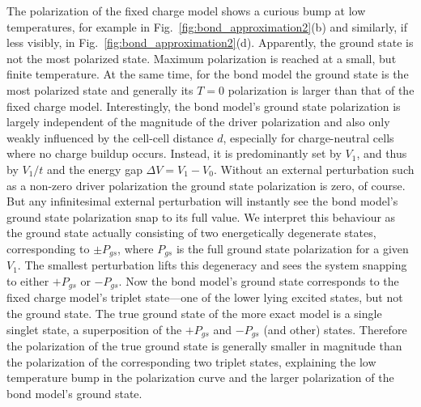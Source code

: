 The polarization of the fixed charge model shows a curious bump at low
temperatures, for example in Fig.~\ref{fig:bond_approximation2}(b) and
similarly, if less visibly, in Fig.~\ref{fig:bond_approximation2}(d).
Apparently, the ground state is not the most polarized state. Maximum
polarization is reached at a small, but finite temperature. At the same time,
for the bond model the ground state is the most polarized state and generally
its $T=0$ polarization is larger than that of the fixed charge model.
Interestingly, the bond model's ground state polarization is largely independent
of the magnitude of the driver polarization and also only weakly influenced by
the cell-cell distance $d$, especially for charge-neutral cells where no charge
buildup occurs. Instead, it is predominantly set by $V_1$, and thus by $V_1/t$
and the energy gap $\Delta V = V_1 - V_0$. Without an external perturbation such
as a non-zero driver polarization the ground state polarization is zero, of
course. But any infinitesimal external perturbation will instantly see the bond
model's ground state polarization snap to its full value. We interpret this
behaviour as the ground state actually consisting of two energetically
degenerate states, corresponding to $\pm P_{gs}$, where $P_{gs}$ is the full
ground state polarization for a given $V_1$. The smallest perturbation lifts
this degeneracy and sees the system snapping to either $+P_{gs}$ or $-P_{gs}$.
Now the bond model's ground state corresponds to the fixed charge model's
triplet state---one of the lower lying excited states, but not the ground state.
The true ground state of the more exact model is a single singlet state, a
superposition of the $+P_{gs}$ and $-P_{gs}$ (and other) states. Therefore the
polarization of the true ground state is generally smaller in magnitude than the
polarization of the corresponding two triplet states, explaining the low
temperature bump in the polarization curve and the larger polarization of the
bond model's ground state.
%
